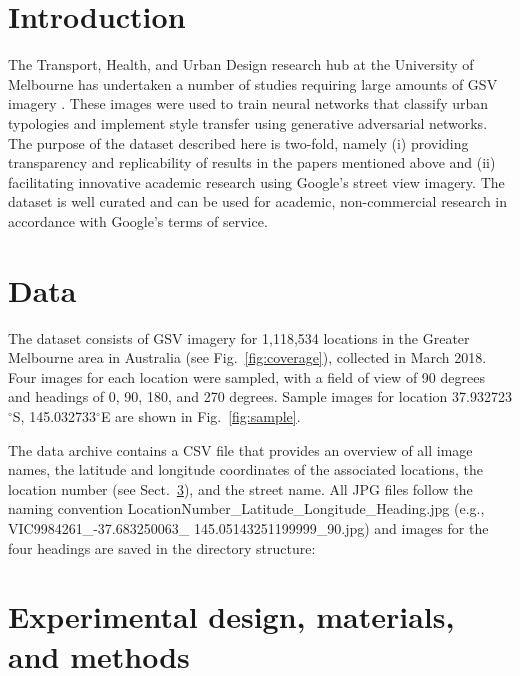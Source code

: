 \documentclass[final,3p,times,authoryear]{elsarticle}
\begin{document}
\section{Introduction}
\label{sec:introduction}

The Transport, Health, and Urban Design research hub at the University of Melbourne has undertaken a number of studies \citep[e.g.,][]{nice2018paris, wijnands2018urban} requiring large amounts of GSV imagery \citep{GoogleMaps2017b}. These images were used to train neural networks that classify urban typologies and implement style transfer using generative adversarial networks. The purpose of the dataset described here is two-fold, namely (i) providing transparency and replicability of results in the papers mentioned above and (ii) facilitating innovative academic research using Google's street view imagery. The dataset is well curated and can be used for academic, non-commercial research in accordance with Google's terms of service.

\section{Data}

The dataset consists of GSV imagery for 1,118,534 locations in the Greater Melbourne area in Australia (see Fig.~\ref{fig:coverage}), collected in March 2018. Four images for each location were sampled, with a field of view of 90 degrees and headings of 0, 90, 180, and 270 degrees. Sample images for location 37.932723$^\circ$S, 145.032733$^\circ$E are shown in Fig.~\ref{fig:sample}.



The data archive contains a CSV file that provides an overview of all image names, the latitude and longitude coordinates of the associated locations, the location number (see Sect.~\ref{sec:create}), and the street name. All JPG files follow the naming convention LocationNumber\_Latitude\_Longitude\_Heading.jpg (e.g., VIC9984261\_-37.683250063\_ 145.05143251199999\_90.jpg) and images for the four headings are saved in the directory structure:




\section{Experimental design, materials, and methods}
\label{sec:create}
\end{document}
